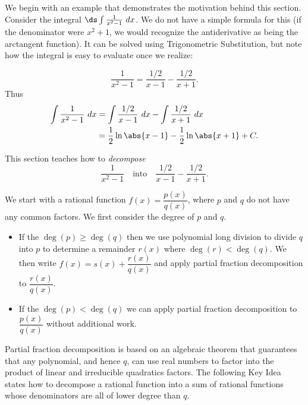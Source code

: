 We begin with an example that demonstrates the motivation behind this section. Consider the integral $\ds\int \frac{1}{x^2-1}\ dx$. We do not have a simple formula for this (if the denominator were $x^2+1$, we would recognize the antiderivative as being the arctangent function). It can be solved using Trigonometric Substitution, but note how the integral is easy to evaluate once we realize:

$$\frac{1}{x^2-1} = \frac{1/2}{x-1} - \frac{1/2}{x+1}.$$
Thus 
\begin{align*}
\int\frac{1}{x^2-1}\ dx &= \int\frac{1/2}{x-1}\ dx - \int\frac{1/2}{x+1}\ dx \\
			&= \frac12\ln\abs{x-1}-\frac12\ln\abs{x+1}+C.
\end{align*}

This section teaches how to \textit{decompose}
\[\frac1{x^2-1}\quad  \text{into}\quad  \frac{1/2}{x-1}-\frac{1/2}{x+1}.\]

We start with a rational function $f(x)=\dfrac{p(x)}{q(x)}$, where $p$ and $q$ do not have any common factors. We first consider the degree of $p$ and $q$. 
\begin{itemize}
	\item If the $\deg(p)\ge\deg(q)$ then we use polynomial long division to divide $q$ into $p$ to determine a remainder $r(x)$ where $\deg(r)<\deg(q)$. We then write $f(x) =s(x)+\dfrac{r(x)}{q(x)}$ and apply partial fraction decomposition to $\dfrac{r(x)}{q(x)}$.
	\item If the $\deg(p)<\deg(q)$ we can apply partial fraction decomposition to $\dfrac{p(x)}{q(x)}$ without additional work.
\end{itemize}

Partial fraction decomposition is based on an algebraic theorem that guarantees that any polynomial, and hence $q$, can use real numbers to factor into the product of linear and irreducible quadratics factors.
The following Key Idea states how to decompose a rational function into a sum of rational functions whose denominators are all of lower degree than $q$.

